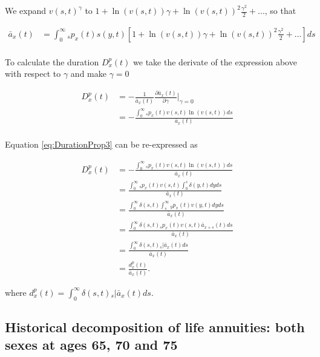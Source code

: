 \documentclass[12pt]{article}
\begin{document}
We expand $v(s,t)^{\gamma}$ to $1+\ln(v(s,t)) \gamma+{\ln(v(s,t))}^2 \frac{\gamma^2}{2}+...$, so that


\begin{equation}\label{eq:DurationProp2}
\begin{split}
\bar{a}_x(t) &= \int_0^\infty {}_sp_x(t) s(y,t)[1+\ln(v(s,t)) \gamma+{\ln(v(s,t))}^2 \frac{\gamma^2}{2}+...]ds\\
\end{split}
\end{equation}


To calculate the duration ${D}^{p}_{x}(t)$ we take the derivate of the expression above with respect to $\gamma$ and make $\gamma=0$

\begin{equation}\label{eq:DurationProp3}
\begin{split}
{D}^{p}_{x}(t)&=-\frac{1}{\bar{a}_x(t)}\frac{\partial \bar{a}_x(t)}{\partial \gamma} \bigg\rvert_{\gamma=0} \\
&= -\frac{\int_0^\infty {}_sp_x(t) v(s,t) \ln(v(s,t))ds}{\bar{a}_x(t)} \\
\end{split}
\end{equation}


Equation \ref{eq:DurationProp3} can be re-expressed as 


\begin{equation}\label{eq:DurationProp4}
\begin{split}
{D}^{p}_{x}(t) &= -\frac{\int_0^\infty {}_sp_x(t) v(s,t) \ln(v(s,t))ds}{\bar{a}_x(t)}\\
&= \frac{\int_0^\infty {}_sp_x(t) v(s,t) \int_0^{s} \delta(y,t)dy ds }{\bar{a}_x(t)}\\
&= \frac{\int_0^\infty \delta(s,t)  \int_{s}^{\infty} {}_{y}p_x(t) v(y,t)dy ds }{\bar{a}_x(t)}\\
&= \frac{\int_0^\infty \delta(s,t) {}_sp_x(t) v(s,t) \bar{a}_{x+s}(t)  ds }{\bar{a}_x(t)}\\
&= \frac{\int_0^\infty \delta(s,t) {}_s|\bar{a}_x(t) ds}{\bar{a}_x(t)} \\
&= \frac{{d}^{p}_{x}(t)}{\bar{a}_x(t)}.
\end{split}
\end{equation}



where ${d}^{p}_{x}(t)=\int_0^\infty \delta(s,t) {}_s|\bar{a}_x(t) ds$.


\subsection{Historical decomposition of life annuities: both sexes at ages 65, 70 and 75} \label{sec:olderages}
\end{document}
